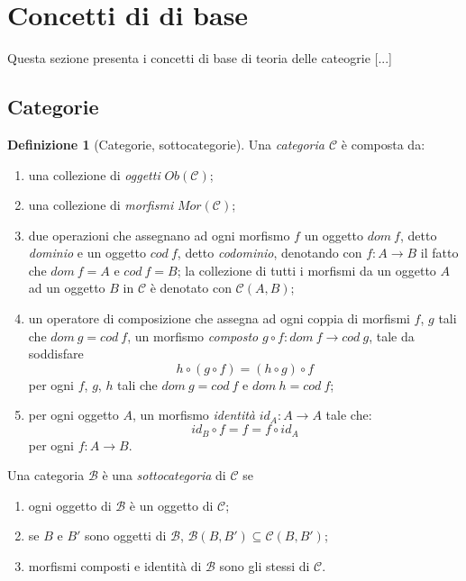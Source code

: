\documentclass{article}
\theoremstyle{plain}
\theoremstyle{definition}
\newtheorem{definition}[theorem]{Definizione}
\newcommand{\id}[1]{id_{#1}}
\begin{document}
\section{Concetti di di base}

Questa sezione presenta i concetti di base di teoria delle cateogrie [...] 

\subsection{Categorie}

	\begin{definition}[Categorie, sottocategorie]
		Una \emph{categoria $\mathcal{C}$} è composta da:
		\begin{enumerate}
			\item una collezione di \emph{oggetti} $Ob(\mathcal{C})$;
			\item una collezione di \emph{morfismi} $Mor(\mathcal{C})$;
			\item due operazioni che assegnano ad ogni morfismo $f$ un 
				oggetto $dom\ f$, detto \emph{dominio} e un oggetto $cod\ f$, detto \emph{codominio}, 
				denotando con $f: A \rightarrow B$ il fatto che $dom\ f = A \text{ e } cod\ f = B$; 
				la collezione di tutti i morfismi da un oggetto $A$ ad un oggetto $B$ in $\mathcal{C}$ è 
				denotato con $\mathcal{C}(A, B)$;
			\item un operatore di composizione che assegna ad ogni coppia di morfismi $f$, $g$ tali che 
				$dom\ g = cod\ f$, un morfismo \emph{composto} $g \circ f: dom\ f \rightarrow cod\ g$, 
				tale da soddisfare
				\[
					h \circ (g \circ f) = (h \circ g) \circ f
				\]
				per ogni $f$, $g$, $h$ tali che $dom\ g = cod\ f \text{ e } dom\ h = cod\ f$;
			\item per ogni oggetto $A$, un morfismo \emph{identità} $\id{A}: A \rightarrow A$ tale che:
				\[
					\id{B} \circ f = f = f \circ \id{A}
				\]
				per ogni $f: A \rightarrow B$.
		\end{enumerate}

		Una categoria $\mathcal{B}$ è una \emph{sottocategoria} di $\mathcal{C}$ se
		\begin{enumerate}
			\item ogni oggetto di $\mathcal{B}$ è un oggetto di $\mathcal{C}$;
			\item se $B$ e $B'$ sono oggetti di $\mathcal{B}$, $\mathcal{B}(B, B') \subseteq \mathcal{C}(B, B')$;
			\item morfismi composti e identità di $\mathcal{B}$ sono gli stessi di $\mathcal{C}$.
		\end{enumerate}
	\end{definition}
\end{document}
